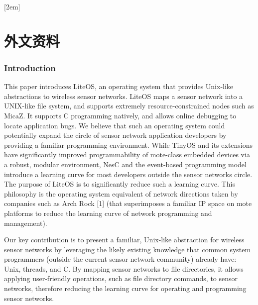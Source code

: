 
[2em]{\vspace{.5\baselineskip}\xiaosan\song}%
             {\prechaptername\CJKnumber{\thecontentslabel}\postchaptername\qquad}{} %
             {}             %
\chapter*{外文资料}
\subsection{Introduction}
This paper introduces LiteOS, an operating system that
provides Unix-like abstractions to wireless sensor networks.
LiteOS maps a sensor network into a UNIX-like file system,
and supports extremely resource-constrained nodes such as
MicaZ. It supports C programming natively, and allows online debugging to locate application bugs. We believe that
such an operating system could potentially expand the circle of sensor network application developers by providing
a familiar programming environment. While TinyOS and
its extensions have significantly improved programmability
of mote-class embedded devices via a robust, modular environment, NesC and the event-based programming model
introduce a learning curve for most developers outside the
sensor networks circle. The purpose of LiteOS is to significantly reduce such a learning curve. This philosophy is
the operating system equivalent of network directions taken
by companies such as Arch Rock [1] (that superimposes a
familiar IP space on mote platforms to reduce the learning
curve of network programming and management).

Our key contribution is to present a familiar, Unix-like
abstraction for wireless sensor networks by leveraging the
likely existing knowledge that common system programmers (outside the current sensor network community) already have: Unix, threads, and C. By mapping sensor networks to file directories, it allows applying user-friendly
operations, such as file directory commands, to sensor networks, therefore reducing the learning curve for operating
and programming sensor networks.

